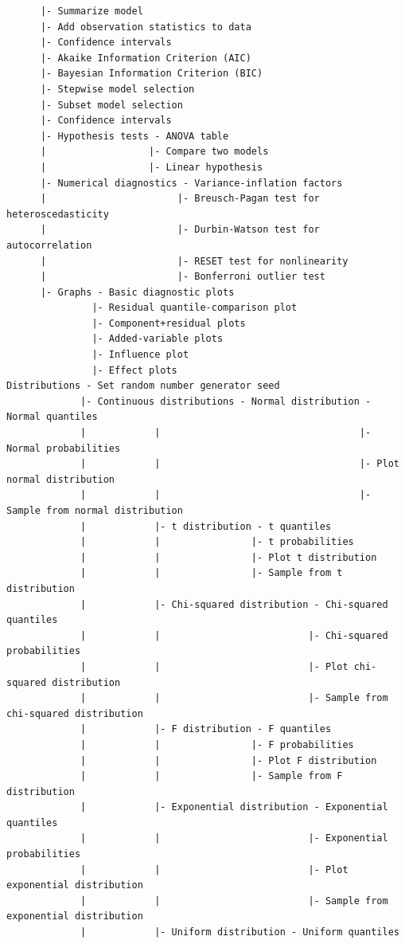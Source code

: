 \documentclass{article}%
\begin{document}
\begin{verbatim}
      |- Summarize model
      |- Add observation statistics to data
      |- Confidence intervals
      |- Akaike Information Criterion (AIC)
      |- Bayesian Information Criterion (BIC)
      |- Stepwise model selection
      |- Subset model selection
      |- Confidence intervals
      |- Hypothesis tests - ANOVA table
      |                  |- Compare two models
      |                  |- Linear hypothesis
      |- Numerical diagnostics - Variance-inflation factors
      |                       |- Breusch-Pagan test for heteroscedasticity
      |                       |- Durbin-Watson test for autocorrelation
      |                       |- RESET test for nonlinearity
      |                       |- Bonferroni outlier test
      |- Graphs - Basic diagnostic plots
               |- Residual quantile-comparison plot
               |- Component+residual plots
               |- Added-variable plots
               |- Influence plot
               |- Effect plots
Distributions - Set random number generator seed
             |- Continuous distributions - Normal distribution - Normal quantiles
             |            |                                   |- Normal probabilities
             |            |                                   |- Plot normal distribution
             |            |                                   |- Sample from normal distribution
             |            |- t distribution - t quantiles
             |            |                |- t probabilities
             |            |                |- Plot t distribution
             |            |                |- Sample from t distribution
             |            |- Chi-squared distribution - Chi-squared quantiles
             |            |                          |- Chi-squared probabilities
             |            |                          |- Plot chi-squared distribution
             |            |                          |- Sample from chi-squared distribution
             |            |- F distribution - F quantiles
             |            |                |- F probabilities
             |            |                |- Plot F distribution
             |            |                |- Sample from F distribution
             |            |- Exponential distribution - Exponential quantiles
             |            |                          |- Exponential probabilities
             |            |                          |- Plot exponential distribution
             |            |                          |- Sample from exponential distribution
             |            |- Uniform distribution - Uniform quantiles

\end{verbatim}
\end{document}
